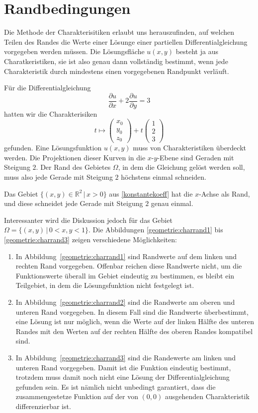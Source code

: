 %
%
%
\section{Randbedingungen}
Die Methode der Charakterisitiken erlaubt uns herauszufinden, auf welchen
Teilen des Randes die Werte einer Lösunge einer partiellen
Differentialgleichung vorgegeben werden müssen.
Die Lösungsfläche $u(x,y)$ besteht ja aus Charatkeristiken, sie ist also
genau dann vollständig bestimmt, wenn jede Charakteristik durch mindestens 
einen vorgegebenen Randpunkt verläuft.

Für die Differentialgleichung
\begin{equation}
\frac{\partial u}{\partial x}+2\frac{\partial u}{\partial y}=3
\label{geometrie:knickbeispiel}
\end{equation}
hatten wir die Charakterisiken 
\[
t\mapsto\begin{pmatrix}x_0\\y_0\\z_0\end{pmatrix}+t\begin{pmatrix}1\\2\\3\end{pmatrix}
\]
gefunden. Eine Lösungsfunktion $u(x,y)$ muss von Charakteristiken
überdeckt werden. 
Die Projektionen dieser Kurven in die $x$-$y$-Ebene sind Geraden
mit Steigung $2$. Der Rand des Gebietes $\Omega$, in dem die Gleichung gelöst
werden soll, muss also jede Gerade mit Steigung $2$ höchstens einmal
schneiden.

Das Gebiet $\{(x,y)\in\mathbb R^2\,|\, x >0\}$  aus \ref{konstantekoeff}
hat die $x$-Achse als Rand, und diese schneidet jede Gerade mit Steigung
$2$ genau einmal.

Interessanter wird die Diskussion jedoch für das Gebiet
$\Omega=\{(x,y)\,|\,0<x,y<1\}$. Die Abbildungen \ref{geometrie:charrand1}
bis \ref{geometrie:charrand3} zeigen verschiedene Möglichkeiten:
\begin{enumerate}
\item
In Abbildung~\ref{geometrie:charrand1} sind Randwerte auf dem linken
und rechten Rand vorgegeben. Offenbar reichen diese Randwerte nicht, um
die Funktionswerte überall im Gebiet eindeutig zu bestimmen, es bleibt
ein Teilgebiet, in dem die Lösungsfunktion nicht festgelegt ist.
\item
In Abbildung~\ref{geometrie:charrand2}
sind die Randwerte am oberen und unteren Rand vorgegeben.
In diesem Fall sind die Randwerte überbestimmt, eine Lösung ist
nur möglich, wenn die Werte auf der linken Hälfte des unteren
Randes mit den Werten auf der rechten Hälfte des oberen Randes
kompatibel sind.
\item
In Abbildung~\ref{geometrie:charrand3}
sind die Randewerte am linken und unteren Rand vorgegeben.
Damit ist die Funktion eindeutig bestimmt, trotzdem
muss damit noch nicht eine Lösung der Differentialgleichung
gefunden sein.
Es ist nämlich nicht unbedingt garantiert, dass die zusammengestetze
Funktion 
auf der von $(0,0)$ ausgehenden Charakteristik differenzierbar ist.
\end{enumerate}

